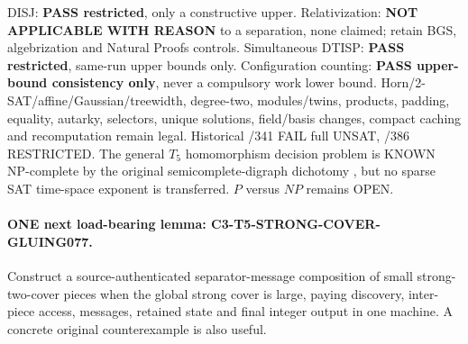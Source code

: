\documentclass[11pt]{article}
\begin{document}
DISJ: \textbf{PASS restricted}, only a constructive upper.
Relativization: \textbf{NOT APPLICABLE WITH REASON}
to a separation, none claimed; retain BGS,
algebrization and Natural Proofs controls.
Simultaneous DTISP: \textbf{PASS restricted}, same-run
upper bounds only. Configuration counting:
\textbf{PASS upper-bound consistency only},
never a compulsory work lower bound.
Horn/2-SAT/affine/Gaussian/treewidth, degree-two,
modules/twins, products, padding, equality, autarky,
selectors, unique solutions, field/basis changes,
compact caching and recomputation remain legal.
Historical /341 FAIL full UNSAT, /386 RESTRICTED.
The general $T_5$ homomorphism decision problem is
KNOWN NP-complete by the original semicomplete-digraph
dichotomy \cite{BangJensenHellMacGillivray1988},
but no sparse SAT time-space exponent is transferred.
$P$ versus $NP$ remains OPEN.

\paragraph{ONE next load-bearing lemma:
C3-T5-STRONG-COVER-GLUING077.}
Construct a source-authenticated separator-message
composition of small strong-two-cover pieces when
the global strong cover is large, paying discovery,
inter-piece access, messages, retained state and final
integer output in one machine. A concrete original
counterexample is also useful.
\end{document}

